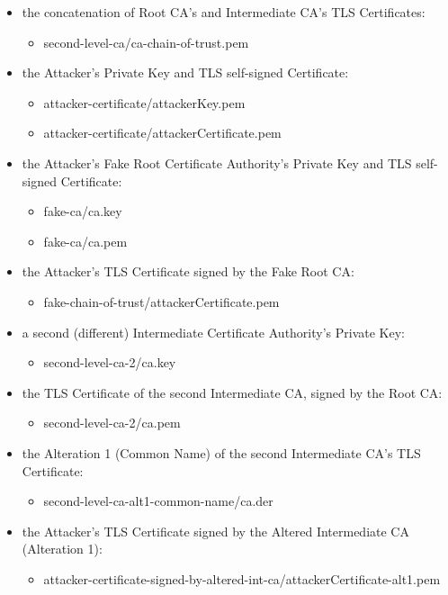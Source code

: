 \documentclass[binding=0.6cm,noexaminfo]{sapthesis}
\begin{document}
\begin{itemize}
	\item the concatenation of Root CA's and Intermediate CA's TLS Certificates:
	\begin{itemize}
		\item second-level-ca/ca-chain-of-trust.pem
	\end{itemize}
	\item the Attacker's Private Key and TLS self-signed Certificate:
	\begin{itemize}
		\item attacker-certificate/attackerKey.pem
		\item attacker-certificate/attackerCertificate.pem
	\end{itemize}
	\item the Attacker's Fake Root Certificate Authority's Private Key and TLS self-signed Certificate:
	\begin{itemize}
		\item fake-ca/ca.key
		\item fake-ca/ca.pem
	\end{itemize}
	\item the Attacker's TLS Certificate signed by the Fake Root CA:
	\begin{itemize}
		\item fake-chain-of-trust/attackerCertificate.pem
	\end{itemize}
	\item a second (different) Intermediate Certificate Authority's Private Key:
	\begin{itemize}
		\item second-level-ca-2/ca.key
	\end{itemize}
	\item the TLS Certificate of the second Intermediate CA, signed by the Root CA:
	\begin{itemize}
		\item second-level-ca-2/ca.pem
	\end{itemize}
	\item the Alteration 1 (Common Name) of the second Intermediate CA's TLS Certificate:
	\begin{itemize}
		\item second-level-ca-alt1-common-name/ca.der
	\end{itemize}
	\item the Attacker's TLS Certificate signed by the Altered Intermediate CA (Alteration 1):
	\begin{itemize}
		\item attacker-certificate-signed-by-altered-int-ca/attackerCertificate-alt1.pem

\end{itemize}
\end{itemize}
\end{document}
